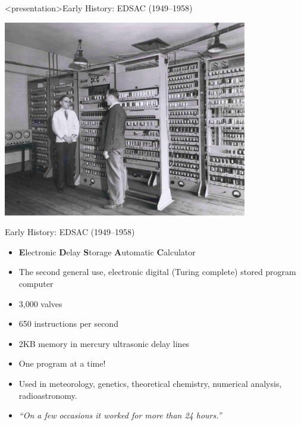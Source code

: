 \begin{frame}<presentation>{Early History: EDSAC (1949--1958)}
\centerline{\includegraphics[width=0.8\textwidth]{imgs/edsac_wilkes.jpg}}%
\smallskip
\end{frame}

\begin{frame}{Early History: EDSAC (1949--1958)}
\begin{itemize}
\item{\textbf{E}lectronic \textbf{D}elay \textbf{S}torage \textbf{A}utomatic \textbf{C}alculator}
\item{The second general use, electronic digital (Turing complete) stored program computer}
\item{3,000 valves}
\item{650 instructions per second}
\item{2KB memory in mercury ultrasonic delay lines}
\item{One program at a time!}
\item{Used in meteorology, genetics, theoretical chemistry, numerical analysis, radioastronomy.}
\pause
\item{\emph{``On a few occasions it worked for more than 24 hours.''}}
\end{itemize}
\end{frame}

